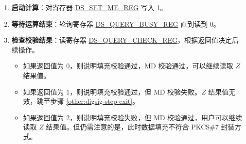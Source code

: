 \documentclass[main\_\_CN.tex]{subfiles}
\begin{document}
\begin{enumerate}
\begin{itemize}
        \item 将 \begin{math}\widehat{Box}_{i}\end{math}
        (\begin{math}i \in \{ 0, 1, \dots, 11 \} \end{math})
        写入存储器 \hyperref[DSBOXMEM]{DS\_BOX\_MEM}。
        
        其中 存储器 
        \hyperref[DSYMEM]{DS\_Y\_MEM}、
        \hyperref[DSMMEM]{DS\_M\_MEM}、
        \hyperref[DSRBMEM]{DS\_RB\_MEM} 的
        容量均为 96 个字，
        而存储器 \hyperref[DSBOXMEM]{DS\_BOX\_MEM} 容量只有 12 个字。
        每一个字刚好存放一个 \begin{math}b\end{math} 进制数。
        存储块以小端字节序进行存储，即存储器的低地址存放运算子的低位进制数，高地址存放运算子的高位进制数。
    
    \end{itemize}

    \item {\bfseries 启动计算}：对寄存器 \hyperref[regdesc:DSSETMEREG]{DS\_SET\_ME\_REG} 写入 1。

    \item {\bfseries 等待运算结束}：轮询寄存器 \hyperref[regdesc:DSQUERYBUSYREG]{DS\_QUERY\_BUSY\_REG} 直到读到 0。

    \item {\bfseries 检查校验结果}：读寄存器 \hyperref[regdesc:DSQUERYCHECKREG]{DS\_QUERY\_CHECK\_REG}，根据返回值决定后续操作。
    
    \begin{itemize}
    
        \item 如果返回值为 0，则说明填充校验通过，MD 校验通过，可以继续读取 \begin{math}Z\end{math} 结果值。
        
        \item 如果返回值为 1，则说明填充校验通过，但 MD 校验失败。\begin{math}Z\end{math} 结果值无效，跳至步骤 \ref{other:digsig-step-exit}。
        
        \item 如果返回值为 2，则说明填充校验失败，但 MD 校验通过，用户可以继续读取 \begin{math}Z\end{math} 结果值。但仍需注意的是，此时数据填充不符合 PKCS\#7 封装方式。
        

\end{itemize}
\end{enumerate}
\end{document}
